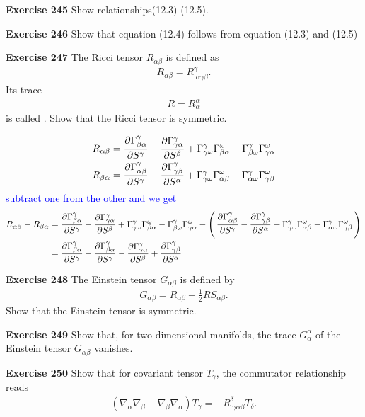 \documentclass[12pt,a4paper]{report}
\newcommand{\BLUE}[1]{\textcolor{blue}{#1}}
\newcommand{\RIEMANN}[4]{ \PART{\Gamma^#1_{#4#2}}{S^#3} - \PART{\Gamma^#1_{#3#2}}{S^#4} + \Gamma^#1_{#3\omega}\Gamma^\omega_{#4#2} - \Gamma^#1_{#4\omega}\Gamma^{\omega}_{#3#2}}
\begin{document}
\begin{description}
\item \textbf{Exercise 245} Show relationships(12.3)-(12.5).

\item \textbf{Exercise 246} Show that equation (12.4) follows from equation (12.3) and (12.5)

\item \textbf{Exercise 247} The Ricci tensor $R_{\alpha\beta}$ is defined as
\begin{align*}
	R_{\alpha\beta} = R^\gamma_{.\alpha\gamma\beta}.
\end{align*}Its trace
\begin{align*}
	R = R^\alpha_\alpha
\end{align*}is called .  Show that the Ricci tensor is symmetric.

\BLUE{\begin{align*}
	R_{\alpha\beta} &= \RIEMANN{\gamma}{\alpha}{\gamma}{\beta}\\
	R_{\beta\alpha} &= \RIEMANN{\gamma}{\beta}{\gamma}{\alpha}
\end{align*}subtract one from the other and we get 
\begin{align*}
	R_{\alpha\beta} - R_{\beta\alpha} &= \RIEMANN{\gamma}{\alpha}{\gamma}{\beta} - \PAREN{\RIEMANN{\gamma}{\beta}{\gamma}{\alpha}} \\
	&= \PART{\Gamma^\gamma_{\beta\alpha}}{S^\gamma} - \PART{\Gamma^\gamma_{\beta\alpha}}{S^\gamma} - \PART{\Gamma^\gamma_{\gamma\alpha}}{S^\beta} + \PART{\Gamma^\gamma_{\gamma\beta}}{S^\alpha}
\end{align*}
}

\item \textbf{Exercise 248} The Einstein tensor $G_{\alpha\beta}$ is defined by 
\begin{align*}
	G_{\alpha\beta} = R_{\alpha\beta} - \frac{1}{2}RS_{\alpha\beta}.
\end{align*} Show that the Einstein tensor is symmetric.

\item \textbf{Exercise 249} Show that, for two-dimensional manifolds, the trace $G^\alpha_\alpha$ of the Einstein tensor $G_{\alpha\beta}$ vanishes.

\item \textbf{Exercise 250} Show that for covariant tensor $T_\gamma$, the commutator relationship reads
\begin{align*}
	(\nabla_\alpha\nabla_\beta-\nabla_\beta\nabla_\alpha) T_\gamma = -R^\delta_{.\gamma\alpha\beta}T_\delta.
\end{align*}


\end{description}
\end{document}
